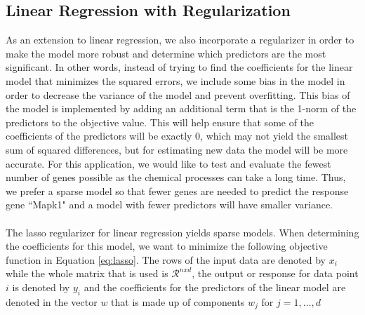 \documentclass{article}
\begin{document}
\subsection{Linear Regression with Regularization}
As an extension to linear regression, we also incorporate a regularizer in order to make the model more robust and determine which predictors are the most significant.  In other words, instead of trying to find the coefficients for the linear model that minimizes the squared errors, we include some bias in the model in order to decrease the variance of the model and prevent overfitting.  This bias of the model is implemented by adding an additional term that is the 1-norm of the predictors to the objective value. This will help ensure that some of the coefficients of the predictors will be exactly $0$, which may not yield the smallest sum of squared differences, but for estimating new data the model will be more accurate.  For this application, we would like to test and evaluate the fewest number of genes possible as the chemical processes can take a long time.  Thus, we prefer a sparse model so that fewer genes are needed to predict the response gene ``Mapk1" and a model with fewer predictors will have smaller variance.\\
\null\\
The lasso regularizer for linear regression yields sparse models.  When determining the coefficients for this model, we want to minimize the following objective function in Equation \ref{eq:lasso}.  The rows of the input data are denoted by $x_i$ while the whole matrix that is used is $\mathcal{R}^{nxd}$, the output or response for data point $i$ is denoted by $y_i$ and the coefficients for the predictors of the linear model are denoted in the vector $w$ that is made up of components $w_j$ for $j=1,\dots,d$
\end{document}
